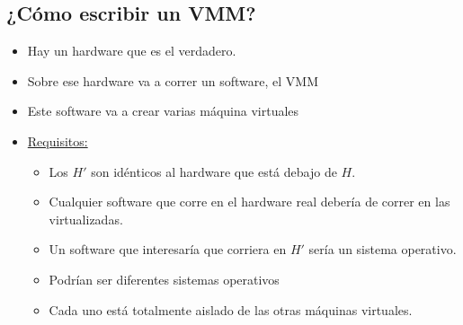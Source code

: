 \documentclass[12pt, times]{simauth}
\begin{document}
\subsection{¿Cómo escribir un VMM?}

\begin{center}
\end{center}

\begin{itemize}

\item Hay un hardware que es el verdadero.
\item Sobre ese hardware va a correr un software, el VMM
\item Este software va a crear varias máquina virtuales 
\item \underline{Requisitos:}
    \begin{itemize}
        \item Los $H'$ son idénticos al hardware que está debajo de $H$.
        \item Cualquier software que corre en el hardware real debería de correr en las virtualizadas.
        \item Un software que interesaría que corriera en $H'$ sería un sistema operativo.
        \item Podrían ser diferentes sistemas operativos
        \item Cada uno está totalmente aislado de las otras máquinas virtuales.
    \end{itemize}
\end{itemize}
\end{document}
